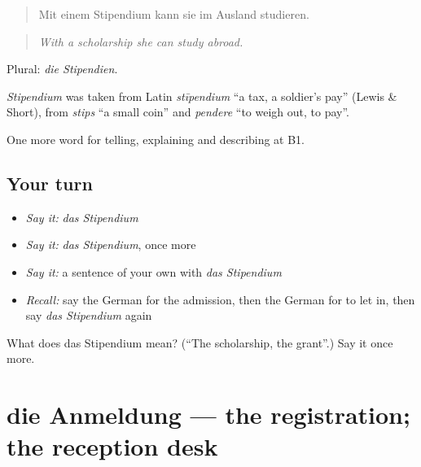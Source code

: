 \begin{quote}
Mit einem Stipendium kann sie im Ausland studieren.
\end{quote}

\begin{quote}
\emph{With a scholarship she can study abroad.}
\end{quote}

Plural: \emph{die Stipendien}.

\begin{cousinweb}
\emph{Stipendium} was taken from Latin \emph{stīpendium} \textquotedblleft{}a tax, a soldier's pay\textquotedblright{} (Lewis \& Short), from \emph{stips} \textquotedblleft{}a small coin\textquotedblright{} and \emph{pendere} \textquotedblleft{}to weigh out, to pay\textquotedblright{}.
\end{cousinweb}

\begin{grammarlens}[title={What you've built}]
One more word for telling, explaining and describing at B1.
\end{grammarlens}

\subsection*{Your turn}
\begin{itemize}
\raggedright
  \item \emph{Say it:} \emph{das Stipendium}
  \item \emph{Say it:} \emph{das Stipendium}, once more
  \item \emph{Say it:} a sentence of your own with \emph{das Stipendium}
  \item \emph{Recall:} say the German for the admission, then the German for to let in, then say \emph{das Stipendium} again
\end{itemize}

\begin{tcolorbox}[breakable,colback=teal!4,colframe=teal!35!black,title={Before you move on}]
What does das Stipendium mean? (\textquotedblleft{}The scholarship, the grant\textquotedblright{}.) Say it once more.
\end{tcolorbox}
\section[die Anmeldung]{die Anmeldung — the registration; the reception desk}

\label{lesson:GE-C380-anmeldung}



